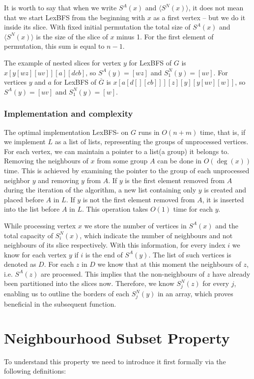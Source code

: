 It is worth to say that when we write $S^A(x)$ and $\langle S^N(x) \rangle$, it does not mean that we start LexBFS from the beginning with $x$ as a first vertex -- but we do it inside its slice. With fixed initial permutation the total size of $S^A(x)$ and $\langle S^N(x) \rangle$ is the size of the slice of $x$ minus 1. For the first element of permutation, this sum is equal to $n-1$.

The example of nested slices for vertex $y$ for LexBFS of $G$ is $x[y[wz][uv]][a][dcb]$, so $S^A(y)=[wz]$ and $S^N_1(y)=[uv]$. For vertices $y$ and $a$ for LexBFS of $\overline{G}$ is $x[a[d[][cb]]][z][y][y[uv][w]]$, so $S^A(y)=[uv]$ and $S^N_1(y)=[w]$.

\subsubsection{Implementation and complexity}
The optimal implementation LexBFS- on $G$ runs in $O(n+m)$ time, that is, if we implement $L$ as a list of lists, representing the groups of unprocessed vertices. For each vertex, we can maintain a pointer to a list(a group) it belongs to. Removing the neighbours of $x$ from some group $A$ can be done in $O(\deg(x))$ time. This is achieved by examining the pointer to the group of each unprocessed neighbor $y$ and removing $y$ from $A$. If $y$ is the first element removed from $A$ during the iteration of the algorithm, a new list containing only $y$ is created and placed before $A$ in $L$. If $y$ is not the first element removed from $A$, it is inserted into the list before $A$ in $L$. This operation takes $O(1)$ time for each $y$.

While processing vertex $x$ we store the number of vertices in $S^A(x)$ and the total capacity of $S^N_i(x)$, which indicate the number of neighbours and not neighbours of its slice respectively. With this information, for every index $i$ we know for each vertex $y$ if $i$ is the end of $S^A(y)$. The list of such vertices is denoted as $D$. For each $z$ in $D$ we know that at this moment the neighbours of $z$, i.e. $S^A(z)$ are processed. This implies that the non-neighbours of $z$ have already been partitioned into the slices now. Therefore, we know $S^N_j(z)$ for every $j$, enabling us to outline the borders of each $S^N_j(y)$ in an array, which proves beneficial in the subsequent function.

\section{Neighbourhood Subset Property}
To understand this property we need to introduce it first formally via the following definitions:


